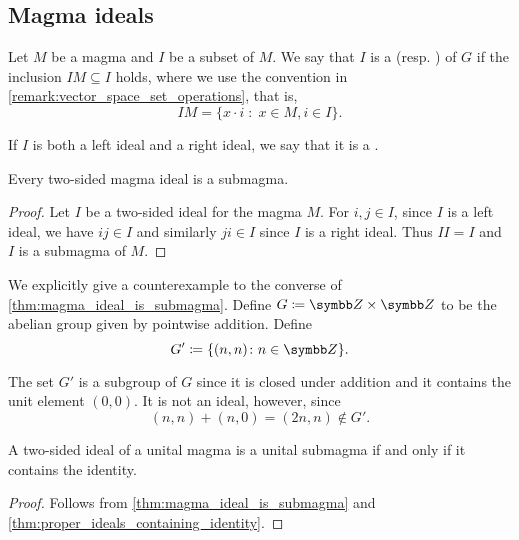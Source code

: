 \subsection{Magma ideals}\label{sec:magma_ideals}

\begin{definition}\label{def:magma_ideal}
  Let \( M \) be a magma and \( I \) be a subset of \( M \). We say that \( I \) is a  (resp. ) of \( G \) if the inclusion \( IM \subseteq I \) holds, where we use the convention in \cref{remark:vector_space_set_operations}, that is,
  \begin{equation*}
    IM = \{ x \cdot i \;\colon\; x \in M, i \in I \}.
  \end{equation*}

  If \( I \) is both a left ideal and a right ideal, we say that it is a .
\end{definition}

\begin{proposition}\label{thm:magma_ideal_is_submagma}
  Every two-sided magma ideal is a submagma.
\end{proposition}
\begin{proof}
  Let \( I \) be a two-sided ideal for the magma \( M \). For \( i, j \in I \), since \( I \) is a left ideal, we have \( ij \in I \) and similarly \( ji \in I \) since \( I \) is a right ideal. Thus \( II = I \) and \( I \) is a submagma of \( M \).
\end{proof}

\begin{example}\label{ex:subgroup_is_not_ideal}
  We explicitly give a counterexample to the converse of \cref{thm:magma_ideal_is_submagma}. Define \( G \coloneqq \BZ \times \BZ \) to be the abelian group given by pointwise addition. Define
  \begin{equation*}
    G' \coloneqq \{ (n, n) \colon n \in \BZ \}.
  \end{equation*}

  The set \( G' \) is a subgroup of \( G \) since it is closed under addition and it contains the unit element \( (0, 0) \). It is not an ideal, however, since
  \begin{equation*}
    (n, n) + (n, 0) = (2n, n) \not\in G'.
  \end{equation*}
\end{example}

\begin{proposition}\label{thm:unital_magma_ideal_is_submagma_iff_contains_identity}
  A two-sided ideal of a unital magma is a unital submagma if and only if it contains the identity.
\end{proposition}
\begin{proof}
  Follows from \cref{thm:magma_ideal_is_submagma} and \cref{thm:proper_ideals_containing_identity}.
\end{proof}

